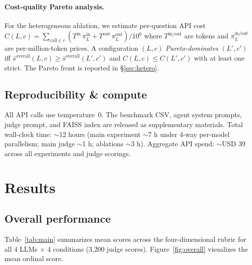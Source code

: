\documentclass[final, 11pt, 3p]{elsarticle}
\begin{document}
\paragraph{Cost-quality Pareto analysis.} For the heterogeneous
ablation, we estimate per-question API cost
$C(L, c) = \sum_{\mathrm{call} \in c} (T^{\mathrm{in}}\,\pi^{\mathrm{in}}_{L}
+ T^{\mathrm{out}}\,\pi^{\mathrm{out}}_{L})/10^{6}$ where $T^{\mathrm{in/out}}$
are tokens and $\pi^{\mathrm{in/out}}_L$ are per-million-token prices.
A configuration $(L, c)$ \emph{Pareto-dominates} $(L', c')$ iff
$\bar{s}^{\text{overall}}(L,c) \geq \bar{s}^{\text{overall}}(L',c')$
and $C(L,c) \leq C(L',c')$ with at least one strict. The Pareto front
is reported in \S\ref{sec:hetero}.

\subsection{Reproducibility \& compute}
\label{sec:repro}
All API calls use temperature~0. The benchmark CSV, agent system
prompts, judge prompt, and FAISS index are released as supplementary
materials. Total wall-clock time: $\sim$12 hours (main experiment
$\sim$7 h under 4-way per-model parallelism; main judge $\sim$1 h;
ablations $\sim$3 h). Aggregate API spend: $\sim$USD 39 across all
experiments and judge scorings.

\section{Results}
\label{sec:results}

\subsection{Overall performance}
\label{sec:overall}
Table~\ref{tab:main} summarizes mean scores across the four-dimensional
rubric for all 4 LLMs $\times$ 4 conditions (3{,}200 judge scores).
Figure~\ref{fig:overall} visualizes the mean ordinal score.
\end{document}
